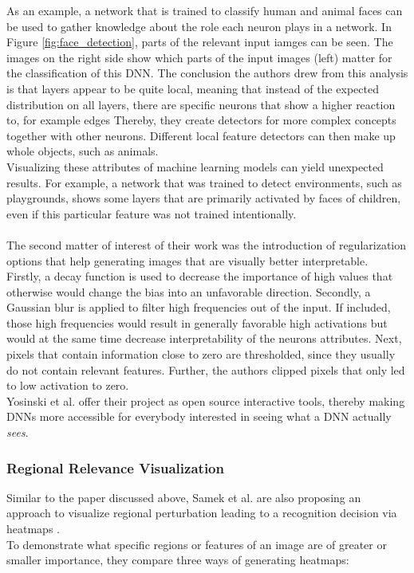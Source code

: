 \documentclass{acmsiggraph}               %
\begin{document}
As an example, a network that is trained to classify human and animal faces can be used to gather knowledge about the role each neuron plays in a network. In Figure \ref{fig:face_detection}, parts of the relevant input iamges can be seen. The images on the right side show which parts of the input images (left) matter for the classification of this DNN. The conclusion the authors drew from this analysis is that layers appear to be quite local, meaning that instead of the expected distribution on all layers, there are specific neurons that show a higher reaction to, for example edges Thereby, they create detectors for more complex concepts together with other neurons. Different local feature detectors can then make up whole objects, such as animals. \\
Visualizing these attributes of machine learning models can yield unexpected results. For example, a network that was trained to detect environments, such as playgrounds, shows some layers that are primarily activated by faces of children, even if this particular feature was not trained intentionally.\\\\
The second matter of interest of their work was the introduction of regularization options that help  generating images that are visually better interpretable.\\
Firstly, a decay function is used to decrease the importance of high values that otherwise would change the bias into an unfavorable direction. Secondly, a Gaussian blur is applied to filter high frequencies out of the input. If included, those high frequencies would result in generally favorable high activations but would at the same time decrease interpretability of the neurons attributes. Next, pixels that contain information close to zero are thresholded, since they usually do not contain relevant features. Further, the authors clipped pixels that only led to low activation to zero.\\
Yosinski et al. offer their project as open source interactive tools, thereby making DNNs more accessible for everybody interested in seeing what a DNN actually \textit{sees}.

\subsubsection{Regional Relevance Visualization}
Similar to the paper discussed above, Samek et al. are also proposing an approach to visualize regional perturbation leading to a recognition decision via heatmaps \cite{Samek2017}. \\
To demonstrate what specific regions or features of an image are of greater or smaller importance, they compare three ways of generating heatmaps:
\end{document}
